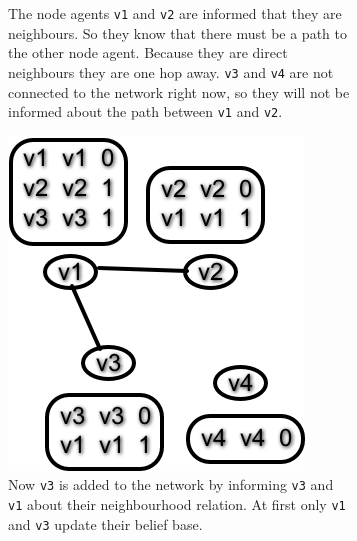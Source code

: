 \begin{figure}
\begin{subfigure}{.45\textwidth}
        \caption{The node agents \texttt{v1} and \texttt{v2} are informed that they are neighbours. So they know that there must be a path to the other node agent. Because they are direct neighbours they are one hop away. \texttt{v3} and \texttt{v4} are not connected to the network right now, so they will not be informed about the path between \texttt{v1} and \texttt{v2}.}
    \end{subfigure}

    \begin{subfigure}{.45\textwidth}
       \includegraphics[width=\textwidth] {images/dv2.png}
       \caption{Now \texttt{v3} is added to the network by informing \texttt{v3} and \texttt{v1} about their neighbourhood relation. At first only \texttt{v1}  and \texttt{v3} update their belief base.}
    \end{subfigure}\quad
    \begin{subfigure}{.45\textwidth}

\end{subfigure}
\end{figure}
